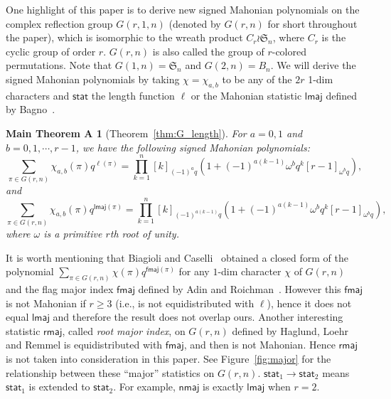 \documentclass[a4paper, reqno, 11pt]{amsart}
\newtheorem*{MainA}{Main Theorem A}
\newcommand{\stat}{{\textsf{stat}}}
\newcommand{\fmaj}{{\textsf{fmaj}}}
\newcommand{\nmaj}{{\textsf{nmaj}}}
\newcommand{\lmaj}{{\textsf{lmaj}}}
\newcommand{\rmaj}{{\textsf{rmaj}}}
\numberwithin{equation}{section}
\begin{document}
One highlight of this paper is to derive new signed Mahonian polynomials on the complex reflection group $G(r,1,n)$ (denoted by $G(r,n)$ for short throughout the paper), which is isomorphic to the wreath product $C_r\wr\mathfrak{S}_n$, where $C_r$ is the cyclic group of order $r$. 
$G(r,n)$ is also called the group of $r$-colored permutations.
Note that $G(1,n)=\mathfrak{S}_n$ and $G(2,n)=B_n$.
We will derive the signed Mahonian polynomials by taking $\chi=\chi_{a,b}$ to be any of the $2r$ 1-dim characters and $\stat$ the length function $\ell$ or the Mahonian statistic $\lmaj$ defined by Bagno~\cite{Bagno_04}.
























\begin{MainA}[Theorem~\ref{thm:G_length}]
For $a=0,1$ and $b=0,1,\cdots, r-1$, we have the following signed Mahonian polynomials:
$$\sum_{\pi\in G(r,n)} \chi_{a,b}(\pi)q^{\ell(\pi)}=\prod_{k=1}^n[k]_{(-1)^aq}\left(1+(-1)^{a(k-1)}\omega^bq^k[r-1]_{\omega^bq}\right),$$
and
$$\sum_{\pi\in G(r,n)} \chi_{a,b}(\pi)q^{\lmaj(\pi)}=\prod_{k=1}^n[k]_{(-1)^{a(k-1)}q}\left(1+(-1)^{a(k-1)}\omega^bq^k[r-1]_{\omega^bq}\right),$$
where $\omega$ is a primitive $r$th root of unity.
\end{MainA}

It is worth mentioning that Biagioli and Caselli~\cite{Biagioli_Caselli_12} obtained a closed form of the polynomial $\sum_{\pi\in G(r,n)}\chi(\pi)q^{\fmaj(\pi)}$ for any $1$-dim character $\chi$ of $G(r,n)$ and the flag major index $\fmaj$ defined by Adin and Roichman~\cite{Adin_Roichman_01}.
However this $\fmaj$ is not Mahonian if $r\ge 3$ (i.e., is not equidistributed with $\ell$), hence it does not equal $\lmaj$ and therefore the result does not overlap ours.
Another interesting statistic $\rmaj$, called \emph{root major index}, on $G(r,n)$ defined by Haglund, Loehr and Remmel \cite{Haglund_Loehr_Remmel_05} is equidistributed with $\fmaj$, and then is not Mahonian.
Hence $\rmaj$ is not taken into consideration in this paper.
See Figure~\ref{fig:major} for the relationship between these ``major'' statistics on $G(r,n)$.
$\stat_1\longrightarrow\stat_2$ means $\stat_1$ is extended to $\stat_2$.
For example, $\nmaj$ is exactly $\lmaj$ when $r=2$.
\end{document}
